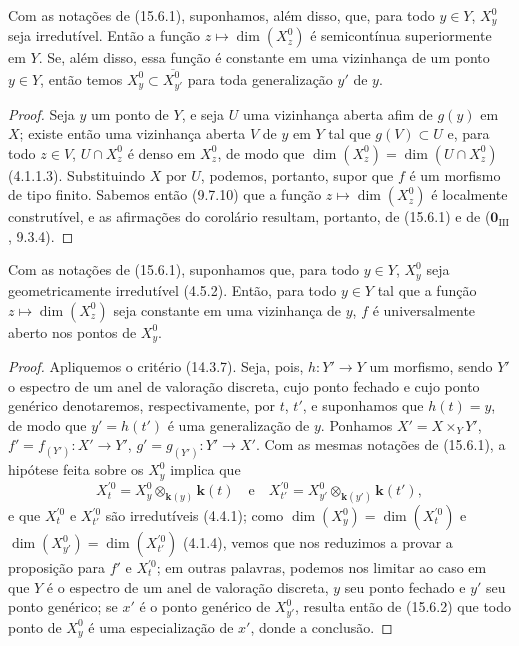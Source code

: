\begin{corollary}[15.6.2]
\label{IV.15.6.2}
Com as notações de (15.6.1), suponhamos, além disso, que, para todo $y\in Y$, $X_y^0$ seja irredutível. Então a função $z\mapsto\dim(X_z^0)$ é semicontínua superiormente em $Y$. Se, além disso, essa função é constante em uma vizinhança de um ponto $y\in Y$, então temos $X_y^0\subset\overline{X_{y'}^0}$ para toda generalização $y'$ de $y$.
\end{corollary}

\begin{proof}
Seja $y$ um ponto de $Y$, e seja $U$ uma vizinhança aberta afim de $g(y)$ em $X$; existe então uma vizinhança aberta $V$ de $y$ em $Y$ tal que $g(V)\subset U$ e, para todo $z\in V$, $U\cap X_z^0$ é denso em $X_z^0$, de modo que $\dim(X_z^0)=\dim(U\cap X_z^0)$ (4.1.1.3). Substituindo $X$ por $U$, podemos, portanto, supor que $f$ é um morfismo de tipo finito. Sabemos então (9.7.10) que a função $z\mapsto\dim(X_z^0)$ é localmente construtível, e as afirmações do corolário resultam, portanto, de (15.6.1) e de ($\mathbf{0}_{\mathrm{III}}$, 9.3.4).
\end{proof}

\begin{proposition}[15.6.3]
\label{IV.15.6.3}
Com as notações de (15.6.1), suponhamos que, para todo $y\in Y$, $X_y^0$ seja geometricamente irredutível (4.5.2). Então, para todo $y\in Y$ tal que a função $z\mapsto\dim(X_z^0)$ seja constante em uma vizinhança de $y$, $f$ é universalmente aberto nos pontos de $X_y^0$.
\end{proposition}

\begin{proof}
Apliquemos o critério (14.3.7). Seja, pois, $h:Y'\to Y$ um morfismo, sendo $Y'$ o espectro de um anel de valoração discreta, cujo ponto fechado e cujo ponto genérico denotaremos, respectivamente, por $t$, $t'$, e suponhamos que $h(t)=y$, de modo que $y'=h(t')$ é uma generalização de $y$. Ponhamos $X'=X\times_Y Y'$, $f'=f_{(Y')}:X'\to Y'$, $g'=g_{(Y')}:Y'\to X'$. Com as mesmas notações de (15.6.1), a hipótese feita sobre os $X_y^0$ implica que
\[
  X_t^{\prime 0}=X_y^0\otimes_{\mathbf{k}(y)}\mathbf{k}(t)
  \quad\text{e}\quad
  X_{t'}^{\prime 0}=X_{y'}^0\otimes_{\mathbf{k}(y')}\mathbf{k}(t'),
\]
e que $X_t^{\prime 0}$ e $X_{t'}^{\prime 0}$ são irredutíveis (4.4.1); como $\dim(X_y^0)=\dim(X_t^{\prime 0})$ e $\dim(X_{y'}^0)=\dim(X_{t'}^{\prime 0})$ (4.1.4), vemos que nos reduzimos a provar a proposição para $f'$ e $X_t^{\prime 0}$; em outras palavras, podemos nos limitar ao caso em que $Y$ é o espectro de um anel de valoração discreta, $y$ seu ponto fechado e $y'$ seu ponto genérico; se $x'$ é o ponto genérico de $X_{y'}^0$, resulta então de (15.6.2) que todo ponto de $X_y^0$ é uma especialização de $x'$, donde a conclusão.
\end{proof}


